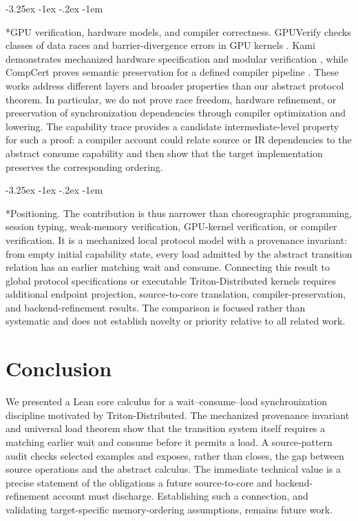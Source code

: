 \documentclass[a4paper,USenglish]{lipics-v2021}
\makeatletter
\renewcommand\paragraph{\@startsection{paragraph}{4}{\z@}%
  {-3.25ex \@plus -1ex \@minus -.2ex}%
  {-1em}%
  {\sffamily\large\bfseries\raggedright}}
\makeatother
\begin{document}
\paragraph*{GPU verification, hardware models, and compiler correctness.} GPUVerify checks classes of data races and barrier-divergence errors in GPU
kernels \cite{rival2012gpuverify}. Kami demonstrates mechanized hardware
specification and modular verification \cite{chlipala2017kami}, while
CompCert proves semantic preservation for a defined compiler pipeline
\cite{leroy2009compcert}. These works address different layers and broader
properties than our abstract protocol theorem. In particular, we do not
prove race freedom, hardware refinement, or preservation of synchronization
dependencies through compiler optimization and lowering. The capability
trace provides a candidate intermediate-level property for such a proof:
a compiler account could relate source or IR dependencies to the abstract
consume capability and then show that the target implementation preserves
the corresponding ordering.

\paragraph*{Positioning.} The contribution is thus narrower than choreographic programming, session
typing, weak-memory verification, GPU-kernel verification, or compiler
verification. It is a mechanized local protocol model with a provenance
invariant: from empty initial capability state, every load admitted by the
abstract transition relation has an earlier matching wait and consume.
Connecting this result to global protocol specifications or executable
Triton-Distributed kernels requires additional endpoint projection,
source-to-core translation, compiler-preservation, and backend-refinement
results. The comparison is focused rather than systematic and does not
establish novelty or priority relative to all related work.

\section{Conclusion}
We presented a Lean core calculus for a wait--consume--load synchronization discipline motivated by Triton-Distributed. The mechanized provenance invariant and universal load theorem show that the transition system itself requires a matching earlier wait and consume before it permits a load. A source-pattern audit checks selected examples and exposes, rather than closes, the gap between source operations and the abstract calculus. The immediate technical value is a precise statement of the obligations a future source-to-core and backend-refinement account must discharge. Establishing such a connection, and validating target-specific memory-ordering assumptions, remains future work.
\end{document}
